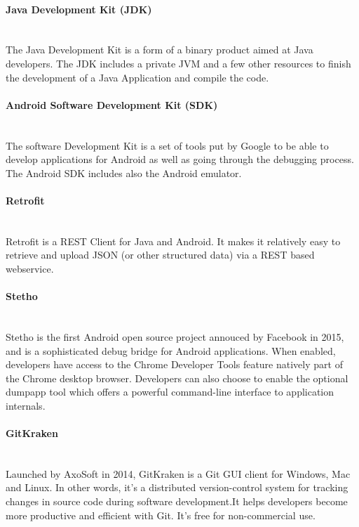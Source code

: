 \paragraph{Java Development Kit (JDK)}~\\
The Java Development Kit is a form of a binary product aimed at Java developers. The JDK includes a private JVM and a few other resources to finish the development of a Java Application and compile the code.

\paragraph{Android Software Development Kit (SDK)}~\\
The software Development Kit is a set of tools put by Google to be able to develop applications for Android as well as going through the debugging process. The Android SDK includes also the Android emulator.

\paragraph{Retrofit}~\\
Retrofit is a REST Client for Java and Android. It makes it relatively easy to retrieve and upload JSON (or other structured data) via a REST based webservice.

\paragraph{Stetho}~\\
Stetho is the first Android open source project annouced by Facebook in 2015, and is a sophisticated debug bridge for Android applications. When enabled, developers have access to the Chrome Developer Tools feature natively part of the Chrome desktop browser. Developers can also choose to enable the optional dumpapp tool which offers a powerful command-line interface to application internals.

\paragraph{GitKraken}~\\
Launched by AxoSoft in 2014, GitKraken is a Git GUI client for Windows, Mac and Linux. In other words, it's a distributed version-control system for tracking changes in source code during software development.It helps developers become more productive and efficient with Git. It's free for non-commercial use.

